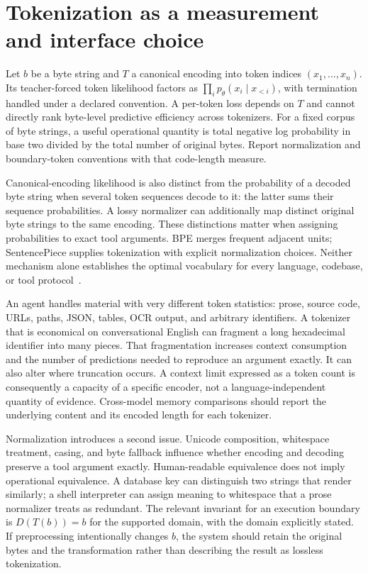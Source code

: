 \section{Tokenization as a measurement and interface choice}
\label{sec:C03:tokens}
Let $b$ be a byte string and $T$ a canonical encoding into token indices $(x_1,\ldots,x_n)$. Its teacher-forced token likelihood factors as $\prod_i p_\theta(x_i\mid x_{<i})$, with termination handled under a declared convention. A per-token loss depends on $T$ and cannot directly rank byte-level predictive efficiency across tokenizers. For a fixed corpus of byte strings, a useful operational quantity is total negative log probability in base two divided by the total number of original bytes. Report normalization and boundary-token conventions with that code-length measure.

Canonical-encoding likelihood is also distinct from the probability of a decoded byte string when several token sequences decode to it: the latter sums their sequence probabilities. A lossy normalizer can additionally map distinct original byte strings to the same encoding. These distinctions matter when assigning probabilities to exact tool arguments. BPE merges frequent adjacent units; SentencePiece supplies tokenization with explicit normalization choices. Neither mechanism alone establishes the optimal vocabulary for every language, codebase, or tool protocol~\cite{sennrich2015bpe,kudo2018sentencepiece}.

An agent handles material with very different token statistics: prose, source code, URLs, paths, JSON, tables, OCR output, and arbitrary identifiers. A tokenizer that is economical on conversational English can fragment a long hexadecimal identifier into many pieces. That fragmentation increases context consumption and the number of predictions needed to reproduce an argument exactly. It can also alter where truncation occurs. A context limit expressed as a token count is consequently a capacity of a specific encoder, not a language-independent quantity of evidence. Cross-model memory comparisons should report the underlying content and its encoded length for each tokenizer.

Normalization introduces a second issue. Unicode composition, whitespace treatment, casing, and byte fallback influence whether encoding and decoding preserve a tool argument exactly. Human-readable equivalence does not imply operational equivalence. A database key can distinguish two strings that render similarly; a shell interpreter can assign meaning to whitespace that a prose normalizer treats as redundant. The relevant invariant for an execution boundary is $D(T(b))=b$ for the supported domain, with the domain explicitly stated. If preprocessing intentionally changes $b$, the system should retain the original bytes and the transformation rather than describing the result as lossless tokenization.


